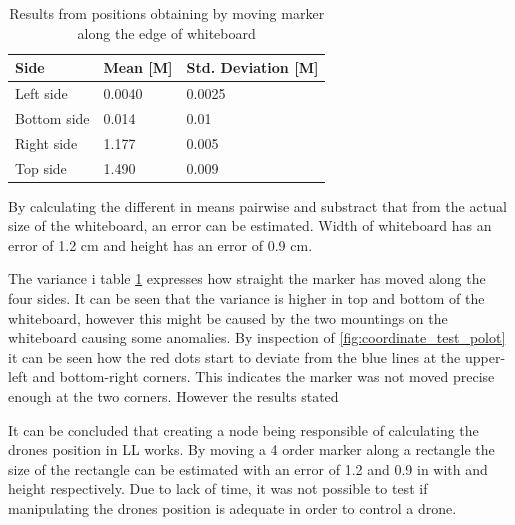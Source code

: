 \begin{table}[H]
\centering
\caption{Results from positions obtaining by moving marker along the edge of whiteboard}
\label{tab:converter_results}
\begin{tabular}{@{}|l|l|l|@{}}
\toprule
\textbf{Side} & \textbf{Mean [M]}  & \textbf{Std. Deviation {[}M{]}} \\ \midrule
Left side     & 0.0040 & 0.0025                  \\ \midrule
Bottom side   & 0.014 & 0.01                   \\ \midrule
Right side    & 1.177 & 0.005                   \\ \midrule
Top side      & 1.490 & 0.009                   \\ \bottomrule
\end{tabular}
\end{table}

By calculating the different in means pairwise and substract that from the actual size of the whiteboard, an error can be estimated.
Width of whiteboard has an error of 1.2 cm and height has an error of 0.9 cm.

The variance i table \ref{tab:converter_results} expresses how straight the marker has moved along the four sides. It can be seen that the variance is higher in top and bottom of the whiteboard, however this might be caused by the two mountings on the whiteboard causing some anomalies.
By inspection of \ref{fig:coordinate_test_polot} it can be seen how the red dots start to deviate from the blue lines at the upper-left and bottom-right corners. This indicates the marker was not moved precise enough at the two corners. However the results stated 


It can be concluded that creating a node being responsible of calculating the drones position in {LL} works. By moving a 4 order marker along a rectangle the size of the rectangle can be estimated with an error of 1.2 and 0.9 in with and height respectively. Due to lack of time, it was not possible to test if manipulating the drones position is adequate in order to control a drone.